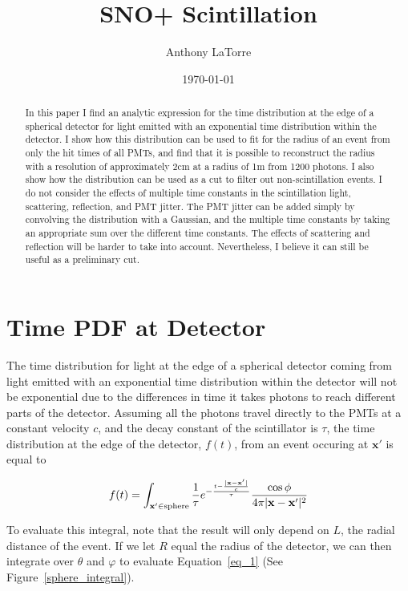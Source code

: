 \documentclass{article}
\author{Anthony LaTorre}
\date{\today}
\title{SNO+ Scintillation}
\begin{document}
\maketitle

\begin{abstract}
    In this paper I find an analytic expression for the time distribution at
    the edge of a spherical detector for light emitted with an exponential time
    distribution within the detector. I show how this distribution can be used
    to fit for the radius of an event from only the hit times of all PMTs, and
    find that it is possible to reconstruct the radius with a resolution of
    approximately 2cm at a radius of 1m from 1200 photons. I also show how the
    distribution can be used as a cut to filter out non-scintillation events. I
    do not consider the effects of multiple time constants in the scintillation
    light, scattering, reflection, and PMT jitter. The PMT jitter can be added
    simply by convolving the distribution with a Gaussian, and the multiple
    time constants by taking an appropriate sum over the different time
    constants.  The effects of scattering and reflection will be harder to take
    into account.  Nevertheless, I believe it can still be useful as a
    preliminary cut.
\end{abstract}

\section{Time PDF at Detector}
The time distribution for light at the edge of a spherical detector coming from
light emitted with an exponential time distribution within the detector will
not be exponential due to the differences in time it takes photons to reach
different parts of the detector. Assuming all the photons travel directly to
the PMTs at a constant velocity $c$, and the decay constant of the scintillator
is $\tau$, the time distribution at the edge of the detector, $f(t)$, from an
event occuring at $\mathbf{x'}$ is equal to

\begin{equation}
    f(t) = \int_{\mathbf{x'} \in \mathrm{sphere}}
    \frac{1}{\tau} e^{-\frac{t-\frac{|\mathbf{x}-\mathbf{x'}|}{c}}{\tau}}
    \frac{\cos{\phi}}{4\pi|\mathbf{x}-\mathbf{x'}|^2} \\[2ex]
    \label{eq_1}
\end{equation}

To evaluate this integral, note that the result will only depend on $L$, the
radial distance of the event. If we let $R$ equal the radius of the detector,
we can then integrate over $\theta$ and $\varphi$ to evaluate
Equation~\ref{eq_1} (See Figure~\ref{sphere_integral}).
\end{document}
